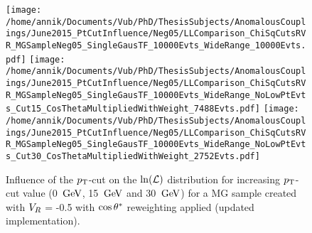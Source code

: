 \begin{figure}[h!t]
 \centering
 \texttt{[image: /home/annik/Documents/Vub/PhD/ThesisSubjects/AnomalousCouplings/June2015\_PtCutInfluence/Neg05/LLComparison\_ChiSqCutsRVR\_MGSampleNeg05\_SingleGausTF\_10000Evts\_WideRange\_10000Evts.pdf]}
 \texttt{[image: /home/annik/Documents/Vub/PhD/ThesisSubjects/AnomalousCouplings/June2015\_PtCutInfluence/Neg05/LLComparison\_ChiSqCutsRVR\_MGSampleNeg05\_SingleGausTF\_10000Evts\_WideRange\_NoLowPtEvts\_Cut15\_CosThetaMultipliedWithWeight\_7488Evts.pdf]}
 \texttt{[image: /home/annik/Documents/Vub/PhD/ThesisSubjects/AnomalousCouplings/June2015\_PtCutInfluence/Neg05/LLComparison\_ChiSqCutsRVR\_MGSampleNeg05\_SingleGausTF\_10000Evts\_WideRange\_NoLowPtEvts\_Cut30\_CosThetaMultipliedWithWeight\_2752Evts.pdf]}
 \caption{Influence of the $p_{\textrm T}$-cut on the $\ln(\mathcal{L})$ distribution for increasing $p_{\textrm T}$-cut value (0 $\, \mathrm{GeV}$, 15 $\, \mathrm{GeV}$ and 30 $\, \mathrm{GeV}$) for a MG sample created with $V_{R}$ = -0.5 with $\cos \theta^{*}$ reweighting applied (updated implementation).}
 \label{fig::CosThetaNeg05Update}
\end{figure}
 
